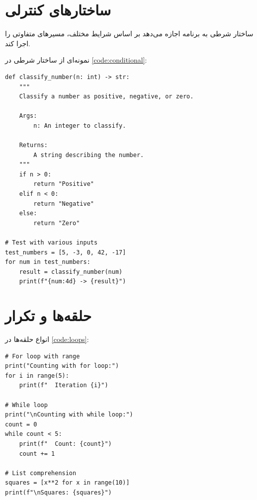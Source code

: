 \documentclass{matinbook}
\begin{document}
\section{ساختارهای کنترلی}
\label{sec:python-control}

\begin{definition}
    ساختار شرطی به برنامه اجازه
    می‌دهد بر اساس شرایط مختلف، مسیرهای متفاوتی را
    اجرا کند.
    \label{def:conditional}
\end{definition}

نمونه‌ای از ساختار شرطی در \cref{code:conditional}:

\begin{latin}
\begin{verbatim}
def classify_number(n: int) -> str:
    """
    Classify a number as positive, negative, or zero.

    Args:
        n: An integer to classify.

    Returns:
        A string describing the number.
    """
    if n > 0:
        return "Positive"
    elif n < 0:
        return "Negative"
    else:
        return "Zero"

# Test with various inputs
test_numbers = [5, -3, 0, 42, -17]
for num in test_numbers:
    result = classify_number(num)
    print(f"{num:4d} -> {result}")
\end{verbatim}
\end{latin}
\label{code:conditional}

\section{حلقه‌ها و تکرار}
\label{sec:python-loops}

انواع حلقه‌ها در \cref{code:loops}:

\begin{latin}
\begin{verbatim}
# For loop with range
print("Counting with for loop:")
for i in range(5):
    print(f"  Iteration {i}")

# While loop
print("\nCounting with while loop:")
count = 0
while count < 5:
    print(f"  Count: {count}")
    count += 1

# List comprehension
squares = [x**2 for x in range(10)]
print(f"\nSquares: {squares}")
\end{verbatim}
\end{latin}
\label{code:loops}
\end{document}
